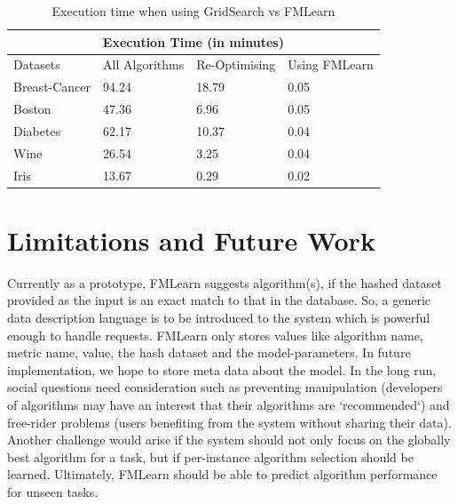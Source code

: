 \documentclass{article}
\begin{document}
\begin{table}[h!]
\centering 
\vspace*{+5pt}
 \begin{tabular}{ |p{0.8in}||p{0.6in}|p{0.6in}|p{0.6in}|  }
 \hline
 \multicolumn{4}{|c|}{Execution Time (in minutes)} \\
 \hline
 Datasets & All Algorithms & Re-Optimising & Using FMLearn \\
 \hline
 Breast-Cancer & 94.24 & 18.79 & 0.05 \\
 \hline
 Boston & 47.36 & 6.96 & 0.05 \\
 \hline
 Diabetes & 62.17 & 10.37 & 0.04 \\
 \hline
 Wine & 26.54 & 3.25 &  0.04 \\
 \hline
 Iris & 13.67 & 0.29 & 0.02 \\
 \hline
\end{tabular}
\vspace*{+5pt}
\caption{Execution time when using GridSearch vs FMLearn}
\label{table:1}
\end{table}
\vspace*{-10pt}

\section{Limitations and Future Work}
Currently as a prototype, FMLearn suggests algorithm(s), if the hashed dataset provided as the input is an exact match to that in the database. So, a generic data description language is to be introduced to the system which is powerful enough to handle requests. FMLearn only stores values like algorithm name, metric name, value, the hash dataset and the model-parameters. In future implementation, we hope to store meta data about the model. In the long run, social questions need consideration such as preventing manipulation (developers of algorithms may have an interest that their algorithms are `recommended`) and free-rider problems (users benefiting from the system without sharing their data). Another challenge would arise if the system should not only focus on the globally best algorithm for a task, but if per-instance algorithm selection should be learned. Ultimately, FMLearn should be able to predict algorithm performance for unseen tasks.  
\end{document}
